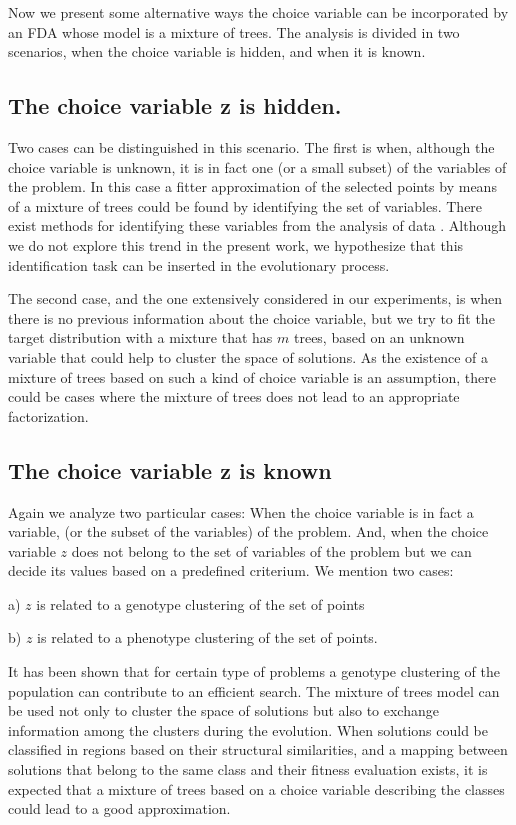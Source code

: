 \documentclass[10pt,thmsa]{article}
\begin{document}
Now we present some alternative ways the choice variable can be incorporated
by an FDA whose model is a mixture of trees. The analysis is divided in two
scenarios, when the choice variable is hidden, and when it is known.

\subsection{The choice variable z is hidden.}

Two cases can be distinguished in this scenario. The first is when, although
the choice variable is unknown, it is in fact one (or a small subset) of the
variables of the problem. In this case a fitter approximation of the
selected points by means of a mixture of trees could be found by identifying
the set of variables. There exist methods for identifying these variables
from the analysis of data \citep{Meila:1999}. Although we do not explore
this trend in the present work, we hypothesize that this identification task
can be inserted in the evolutionary process.

The second case, and the one extensively considered in our experiments, is
when there is no previous information about the choice variable, but we try
to fit the target distribution with a mixture that has $m$ trees, based on
an unknown variable that could help to cluster the space of solutions. As
the existence of a mixture of trees based on such a kind of choice variable
is an assumption, there could be cases where the mixture of trees does not
lead to an appropriate factorization.

\subsection{The choice variable z is known}

Again we analyze two particular cases: When the choice variable is in fact a
variable, (or the subset of the variables) of the problem. And, when the
choice variable $z$ does not belong to the set of variables of the problem
but we can decide its values based on a predefined criterium. We mention two
cases:

a) $z$ is related to a genotype clustering of the set of points

b) $z$ is related to a phenotype clustering of the set of points.

It has been shown \citep{Pelikan_and_Goldberg:2000} that for certain type of
problems a genotype clustering of the population can contribute to an
efficient search. The mixture of trees model can be used not only to cluster
the space of solutions but also to exchange information among the clusters
during the evolution. When solutions could be classified in regions based on
their structural similarities, and a mapping between solutions that belong
to the same class and their fitness evaluation exists, it is expected that a
mixture of trees based on a choice variable describing the classes could
lead to a good approximation.
\end{document}
